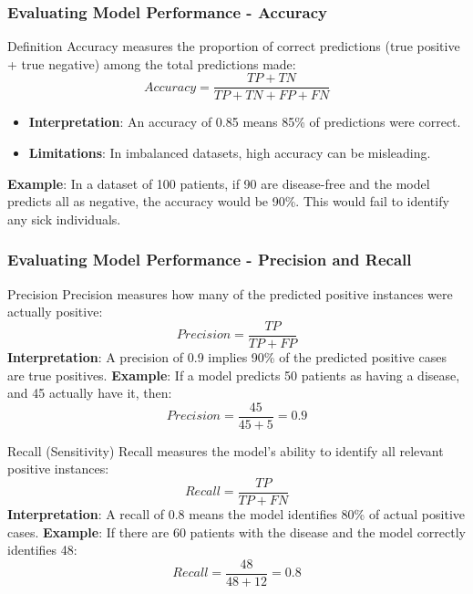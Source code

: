 \documentclass[aspectratio=169]{beamer}
\begin{document}
\begin{frame}[fragile]
    \frametitle{Evaluating Model Performance - Accuracy}
    \begin{block}{Definition}
        Accuracy measures the proportion of correct predictions (true positive + true negative) among the total predictions made:
        \[
        Accuracy = \frac{TP + TN}{TP + TN + FP + FN}
        \]
    \end{block}
    \begin{itemize}
        \item \textbf{Interpretation}: An accuracy of 0.85 means 85\% of predictions were correct.
        \item \textbf{Limitations}: In imbalanced datasets, high accuracy can be misleading.
    \end{itemize}
    \textbf{Example}: In a dataset of 100 patients, if 90 are disease-free and the model predicts all as negative, the accuracy would be 90\%. This would fail to identify any sick individuals.
\end{frame}

\begin{frame}[fragile]
    \frametitle{Evaluating Model Performance - Precision and Recall}
    \begin{block}{Precision}
        Precision measures how many of the predicted positive instances were actually positive:
        \[
        Precision = \frac{TP}{TP + FP}
        \]
        \textbf{Interpretation}: A precision of 0.9 implies 90\% of the predicted positive cases are true positives.
        \textbf{Example}: If a model predicts 50 patients as having a disease, and 45 actually have it, then:
        \[
        Precision = \frac{45}{45 + 5} = 0.9
        \]
    \end{block}

    \begin{block}{Recall (Sensitivity)}
        Recall measures the model’s ability to identify all relevant positive instances:
        \[
        Recall = \frac{TP}{TP + FN}
        \]
        \textbf{Interpretation}: A recall of 0.8 means the model identifies 80\% of actual positive cases.
        \textbf{Example}: If there are 60 patients with the disease and the model correctly identifies 48:
        \[
        Recall = \frac{48}{48 + 12} = 0.8
        \]
    \end{block}
\end{frame}
\end{document}

